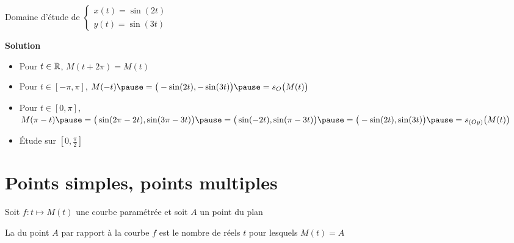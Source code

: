 \begin{frame}
\begin{exemple}
Domaine d'étude de  
$\left\{
\begin{array}{l}
x(t)=\sin(2t)\\
y(t)=\sin(3t)
\end{array}
\right.$
\pause

\vspace*{-1ex}

\textbf{Solution}

\vspace*{-1ex}
\begin{itemize}
  \item Pour $t\in\mathbb{R}$, $M(t+2\pi)=M(t)$
\pause
  \item Pour $t\in[-\pi,\pi]$, \pause $M(-t)\pause= \big(-\sin(2t),-\sin(3t)\big)\pause=s_O\big(M(t)\big)$
\pause
  \item Pour $t\in[0,\pi]$, \pause 
$M(\pi-t)\pause=\big(\sin(2\pi-2t),\sin(3\pi-3t)\big)\pause=\big(\sin(-2t),\sin(\pi-3t)\big)
\pause=\big(-\sin(2t),\sin(3t)\big)\pause=s_{(Oy)}\big(M(t)\big)$
\pause 
  \item \'Etude sur $[0,\frac\pi2]$
\end{itemize}

\pause
\vspace*{-3ex}

\end{exemple}

\end{frame}



\section{Points simples, points multiples}

\begin{frame}

Soit $f : t\mapsto M(t)$ une courbe paramétrée et soit $A$ un point du plan
\begin{mydefinition}
La  du point $A$ par rapport à la courbe $f$ est le nombre 
de réels $t$ pour lesquels $M(t)=A$
\end{mydefinition}

\pause


\end{frame}


